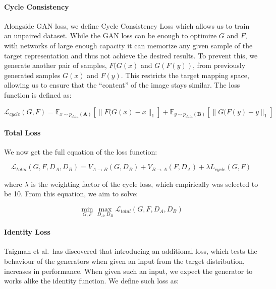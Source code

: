 \documentclass[]{article}
\begin{document}
\paragraph{Cycle Consistency}

Alongside GAN loss, we define Cycle Consistency Loss which allows us to
train an unpaired dataset. While the GAN loss can be enough to optimize
\(G\) and \(F\), with networks of large enough capacity it can memorize
any given sample of the target representation and thus not achieve the
desired results. To prevent this, we generate another pair of samples,
\(F(G(x)\) and \(G(F(y))\), from previously generated samples \(G(x)\)
and \(F(y)\). This restricts the target mapping space, allowing us to
ensure that the ``content'' of the image stays similar. The loss
function is defined as:

\begin{equation}
    \mathcal{L}_{cycle}(G, F) = \mathbb{E}_{x \sim p_{data}(\mathbf{A})}[\|F(G(x) - x\|_1] + \mathbb{E}_{y \sim p_{data}(\mathbf{B})}[\|G(F(y) - y\|_1]
\end{equation}

\paragraph{Total Loss}

We now get the full equation of the loss function:

\begin{equation}
    \mathcal{L}_{total}(G, F, D_A, D_B) = V_{A \rightarrow B}(G, D_B) + V_{B \rightarrow A}(F, D_A) + \lambda L_{cycle}(G, F) \label{eq:cyclegan_total}
\end{equation}

where \(\lambda\) is the weighting factor of the cycle loss, which
empirically was selected to be 10. From this equation, we aim to solve:

\begin{equation}
    \min_{G, F} \max_{D_A, D_B} \mathcal{L}_{total}(G, F, D_A, D_B)
\end{equation}

\paragraph{Identity Loss \label{identity-loss}}

Taigman et al.~has discovered that introducing an additional loss, which
tests the behaviour of the generators when given an input from the
target distribution, increases in performance. When given such an input,
we expect the generator to works alike the identity function. We define
such loss as:
\end{document}
